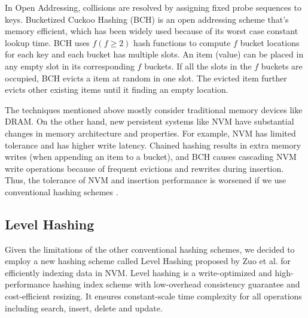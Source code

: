 \documentclass[letterpaper,twocolumn, 11pt]{article}
\begin{document}
In Open Addressing, collisions are resolved by assigning fixed probe sequences to keys. Bucketized Cuckoo Hashing (BCH) \cite{Cuckoo} is an open addressing scheme that's memory efficient, which has been widely used because of its worst case constant lookup time. BCH uses $f (f \geq 2)$ hash functions to compute $f$ bucket locations for each key and each bucket has multiple slots. An item (value) can be placed in any empty slot in its corresponding $f$ buckets. If all the slots in the $f$ buckets are occupied, BCH evicts a item at random in one slot. The evicted item further evicts other existing items until it finding an empty location.   

The techniques mentioned above mostly consider traditional memory devices like DRAM. On the other hand, new persistent systems like NVM have substantial changes in memory architecture and properties. For example, NVM has limited tolerance and has higher write latency. Chained hashing results in extra memory writes (when appending an item to a bucket), and BCH causes cascading NVM write operations because of frequent evictions and rewrites during insertion. Thus, the tolerance of NVM and insertion performance is worsened if we use conventional hashing schemes \cite{levelhashing}. 
\vspace{-0.2cm}
\subsection{Level Hashing}
Given the limitations of the other conventional hashing schemes, we decided to employ a new hashing scheme called Level Hashing proposed by Zuo et al. \cite{levelhashing} for efficiently indexing data in NVM. Level hashing is a write-optimized and high-performance hashing index scheme with low-overhead consistency guarantee and cost-efficient resizing. It ensures constant-scale time complexity for all operations including search, insert, delete and update.
\end{document}
